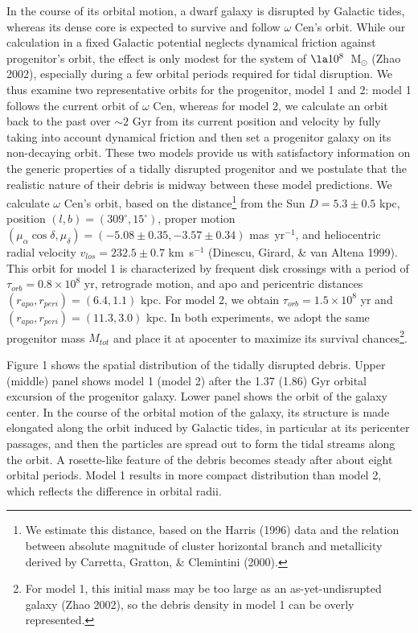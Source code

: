 \documentclass[preprint,12pt]{aastex}
\begin{document}
In the course of its orbital motion, a dwarf galaxy is disrupted by
Galactic tides, whereas its dense core is expected to survive and follow
$\omega$ Cen's orbit. While our calculation in a fixed Galactic
potential neglects dynamical friction against progenitor's orbit, the effect
is only modest for the system of $\la 10^8$~M$_\odot$ (Zhao 2002), especially
during a few orbital periods required for tidal disruption.
We thus examine two representative orbits for the progenitor, model 1
and 2: model 1 follows the current orbit of $\omega$ Cen, whereas for model 2,
we calculate an orbit back to the past over $\sim 2$ Gyr from its current
position and velocity by fully taking into account dynamical friction
and then set a progenitor galaxy on its non-decaying orbit. These two models
provide us with satisfactory information on the generic properties of a tidally
disrupted progenitor and we postulate that the realistic nature of their debris
is midway between these model predictions.
We calculate $\omega$ Cen's orbit, based on the distance\footnote{We estimate
this distance, based on the Harris (1996) data and the relation between
absolute magnitude of cluster horizontal branch and metallicity derived by
Carretta, Gratton, \& Clemintini (2000).} from the Sun $D=5.3 \pm 0.5$ kpc,
position $(l,b)=(309^\circ,15^\circ)$, proper motion
$(\mu_\alpha \cos\delta,\mu_\delta) =(-5.08\pm0.35, -3.57\pm0.34)$
mas~yr$^{-1}$, and heliocentric radial velocity $v_{los} = 232.5 \pm 0.7$
km~s$^{-1}$ (Dinescu, Girard, \& van Altena 1999).
This orbit for model 1 is characterized by frequent disk crossings with a period
of $\tau_{orb} = 0.8 \times 10^8$ yr, retrograde motion, and apo and pericentric
distances $(r_{apo},r_{peri}) = (6.4, 1.1)$ kpc. For model 2,
we obtain $\tau_{orb} = 1.5 \times 10^8$ yr and
$(r_{apo},r_{peri}) = (11.3, 3.0)$ kpc. 
In both experiments, we adopt the same progenitor mass $M_{tot}$ and place it
at apocenter to maximize its survival chances\footnote{For model 1, this initial
mass may be too large as an as-yet-undisrupted galaxy (Zhao 2002), so the debris
density in model 1 can be overly represented.}.

Figure 1 shows the spatial distribution of the tidally disrupted debris.
Upper (middle) panel shows model 1 (model 2) after the 1.37 (1.86) Gyr orbital
excursion of the progenitor galaxy. Lower panel shows the orbit of the galaxy
center. In the course of the orbital motion of the
galaxy, its structure is made elongated along the orbit induced by Galactic
tides, in particular at its pericenter passages, and then the particles are
spread out to form the tidal streams along the orbit.
A rosette-like feature of the debris becomes steady after about eight orbital
periods. Model 1 results in more compact distribution than model 2, which
reflects the difference in orbital radii.
\end{document}
